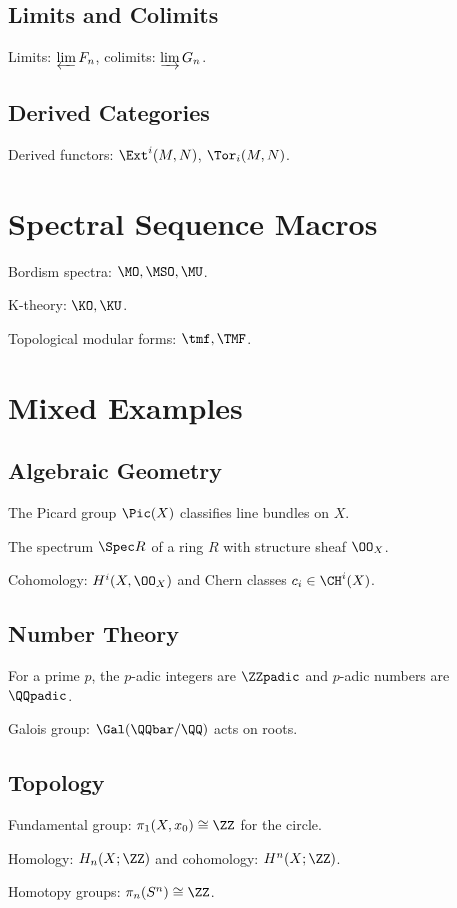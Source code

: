 \documentclass[11pt]{scrartcl}
\begin{document}
\subsection{Limits and Colimits}
Limits: $\varprojlim F_n$, colimits: $\varinjlim G_n$.

\subsection{Derived Categories}
Derived functors: $\Ext^i(M, N)$, $\Tor_i(M, N)$.

\section{Spectral Sequence Macros}

Bordism spectra: $\MO, \MSO, \MU$.

K-theory: $\KO, \KU$.

Topological modular forms: $\tmf, \TMF$.

\section{Mixed Examples}

\subsection{Algebraic Geometry}
The Picard group $\Pic(X)$ classifies line bundles on $X$.

The spectrum $\Spec R$ of a ring $R$ with structure sheaf $\OO_X$.

Cohomology: $H^i(X, \OO_X)$ and Chern classes $c_i \in \CH^i(X)$.

\subsection{Number Theory}
For a prime $p$, the $p$-adic integers are $\ZZpadic$ and $p$-adic numbers are $\QQpadic$.

Galois group: $\Gal(\QQbar / \QQ)$ acts on roots.

\subsection{Topology}
Fundamental group: $\pi_1(X, x_0) \cong \ZZ$ for the circle.

Homology: $H_n(X; \ZZ)$ and cohomology: $H^n(X; \ZZ)$.

Homotopy groups: $\pi_n(S^n) \cong \ZZ$.
\end{document}
